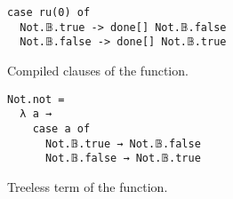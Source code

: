\begin{figure}[h]
\begin{verbatim}
case ru(0) of
  Not.𝔹.true -> done[] Not.𝔹.false
  Not.𝔹.false -> done[] Not.𝔹.true
\end{verbatim}
\caption{Compiled clauses of the  function.}
\label{code:not_cc}
\end{figure}

\begin{figure}[h]
\begin{verbatim}
Not.not =
  λ a →
    case a of
      Not.𝔹.true → Not.𝔹.false
      Not.𝔹.false → Not.𝔹.true
\end{verbatim}
\caption{Treeless term of the  function.}
\label{code:not_tterm}
\end{figure}
